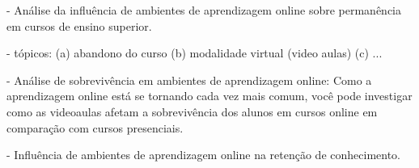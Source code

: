 
- Análise da influência de ambientes de aprendizagem online sobre permanência em cursos de ensino superior.

- tópicos:
    (a) abandono do curso
    (b) modalidade virtual (video aulas)
    (c) ...

- Análise de sobrevivência em ambientes de aprendizagem online:
Como a aprendizagem online está se tornando cada vez mais comum, você pode investigar como as videoaulas afetam a sobrevivência dos alunos em cursos online em comparação com cursos presenciais.


- Influência de ambientes de aprendizagem online na retenção de conhecimento.

